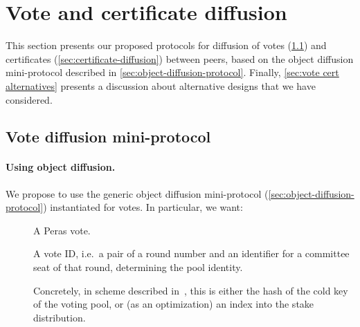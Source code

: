 \section{Vote and certificate diffusion}%
\label{sec:certificate-vote-diffusion}

This section presents our proposed protocols for diffusion of votes (\cref{sec:vote-diffusion}) and certificates (\cref{sec:certificate-diffusion}) between peers, based on the object diffusion mini-protocol described in \cref{sec:object-diffusion-protocol}.
Finally, \cref{sec:vote cert alternatives} presents a discussion about alternative designs that we have considered.

\subsection{Vote diffusion mini-protocol}%
\label{sec:vote-diffusion}



\paragraph{Using object diffusion.}

We propose to use the generic object diffusion mini-protocol (\cref{sec:object-diffusion-protocol}) instantiated for votes.
In particular, we want:
%
\begin{description}
\item[]
  A Peras vote.
\item[]
  A vote ID, i.e.\ a pair of a round number and an identifier for a committee seat of that round, determining the pool identity.

  Concretely, in scheme described in~\cite{peras-cert-report}, this is either the hash of the cold key of the voting pool, or (as an optimization) an index into the stake distribution.
\end{description}

